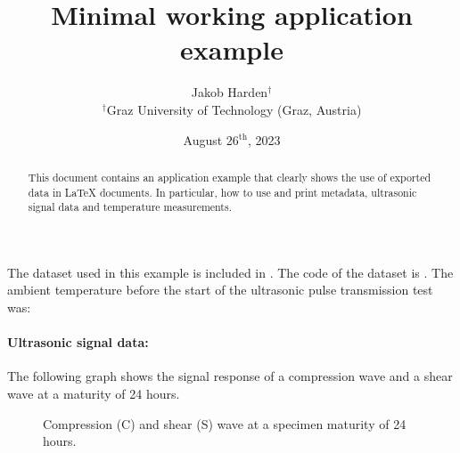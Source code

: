 \documentclass[12pt,a4paper]{article}
\title{Minimal working application example}
\author{Jakob Harden${}^\dag$\\${}^\dag$Graz University of Technology (Graz, Austria)}
\date{August 26${}^{\text{th}}$, 2023}
\begin{document}
	\maketitle
	
	\begin{abstract}
		This document contains an application example that clearly shows the use of exported data in \LaTeX{} documents. In particular, how to use and print metadata, ultrasonic signal data and temperature measurements.
	\end{abstract}
	
	\newpage

	
	
	
	
	
	
	
	The dataset used in this example is included in \textcolor{red}{}\cite{datacem}.
	The code of the dataset is \textcolor{red}{}.
	The ambient temperature before the start of the ultrasonic pulse transmission test was: \textcolor{red}{ }
	
	\paragraph{Ultrasonic signal data:} The following graph shows the signal response of a compression wave and a shear wave at a maturity of 24 hours.
	
	\begin{figure}[ht]
		\centering
		\caption{Compression (C) and shear (S) wave at a specimen maturity of 24 hours.}
	\end{figure}
	
\end{document}
